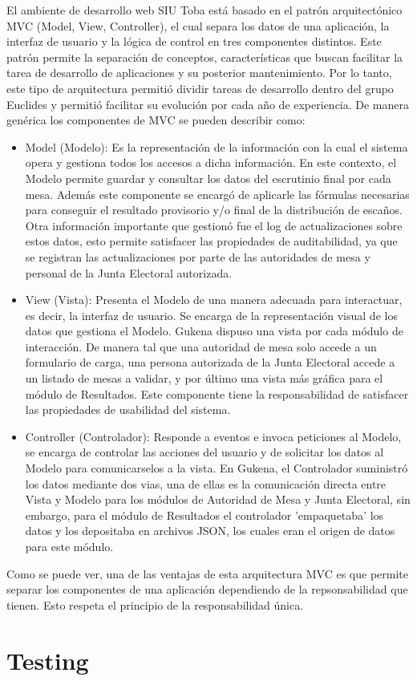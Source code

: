 El ambiente de desarrollo web SIU Toba está basado en el patrón arquitectónico MVC (Model, View, Controller), el cual separa los datos de una aplicación, la interfaz de usuario y la lógica de control en tres componentes distintos. Este patrón permite la separación de conceptos, características que buscan facilitar la tarea de desarrollo de aplicaciones y su posterior mantenimiento. Por lo tanto, este tipo de arquitectura permitió dividir tareas de desarrollo dentro del grupo Euclides y permitió facilitar su evolución por cada año de experiencia. \newline
De manera genérica los componentes de MVC se pueden describir como:
\begin{itemize}
    \item Model (Modelo): Es la representación de la información con la cual el sistema opera y gestiona todos los accesos a dicha información. En este contexto, el Modelo permite guardar y consultar los datos del escrutinio final por cada mesa. Además este componente se encargó de aplicarle las fórmulas necesarias para conseguir el resultado provisorio y/o final de la distribución de escaños. Otra información importante que gestionó fue el log de actualizaciones sobre estos datos, esto permite satisfacer las propiedades de auditabilidad, ya que se registran las actualizaciones por parte de las autoridades de mesa y personal de la Junta Electoral autorizada.
    \item View (Vista): Presenta el Modelo de una manera adecuada para interactuar, es decir, la interfaz de usuario. Se encarga de la representación visual de los datos que gestiona el Modelo. Gukena dispuso una vista por cada módulo de interacción. De manera tal que una autoridad de mesa solo accede a un formulario de carga, una persona autorizada de la Junta Electoral accede a un listado de mesas a validar, y por último una vista más gráfica para el módulo de Resultados. Este componente tiene la responsabilidad de satisfacer las propiedades de usabilidad del sistema.
    \item Controller (Controlador): Responde a eventos e invoca peticiones al Modelo, se encarga de controlar las acciones del usuario y de solicitar los datos al Modelo para comunicarselos a la vista. En Gukena, el Controlador suministró los datos mediante dos vias, una de ellas es la comunicación directa entre Vista y Modelo para los módulos de Autoridad de Mesa y Junta Electoral, sin embargo, para el módulo de Resultados el controlador 'empaquetaba' los datos y los depositaba en archivos JSON, los cuales eran el origen de datos para este módulo.
\end{itemize}
Como se puede ver, una de las ventajas de esta arquitectura MVC es que permite separar los componentes de una aplicación dependiendo de la repsonsabilidad que tienen. Esto respeta el principio de la responsabilidad única.

\section{Testing}